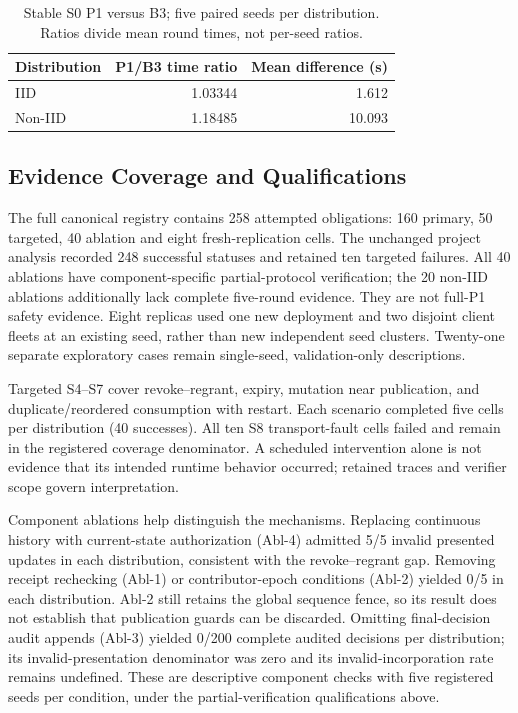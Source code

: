 \documentclass[conference,letterpaper]{IEEEtran}
\begin{document}
\begin{table}[t]
\caption{Stable S0 P1 versus B3; five paired seeds per distribution. Ratios divide mean round times, not per-seed ratios.}
\label{tab:runtime}
\centering
\begin{tabular}{lrr}
\toprule
Distribution & P1/B3 time ratio & Mean difference (s)\\
\midrule
IID & 1.03344 & 1.612\\
Non-IID & 1.18485 & 10.093\\
\bottomrule
\end{tabular}
\end{table}

\subsection{Evidence Coverage and Qualifications}
The full canonical registry contains 258 attempted obligations: 160 primary, 50 targeted, 40 ablation and eight fresh-replication cells. The unchanged project analysis recorded 248 successful statuses and retained ten targeted failures. All 40 ablations have component-specific partial-protocol verification; the 20 non-IID ablations additionally lack complete five-round evidence. They are not full-P1 safety evidence. Eight replicas used one new deployment and two disjoint client fleets at an existing seed, rather than new independent seed clusters. Twenty-one separate exploratory cases remain single-seed, validation-only descriptions.

\balance
Targeted S4--S7 cover revoke--regrant, expiry, mutation near publication, and duplicate/reordered consumption with restart. Each scenario completed five cells per distribution (40 successes). All ten S8 transport-fault cells failed and remain in the registered coverage denominator. A scheduled intervention alone is not evidence that its intended runtime behavior occurred; retained traces and verifier scope govern interpretation.

Component ablations help distinguish the mechanisms. Replacing continuous history with current-state authorization (Abl-4) admitted 5/5 invalid presented updates in each distribution, consistent with the revoke--regrant gap. Removing receipt rechecking (Abl-1) or contributor-epoch conditions (Abl-2) yielded 0/5 in each distribution. Abl-2 still retains the global sequence fence, so its result does not establish that publication guards can be discarded. Omitting final-decision audit appends (Abl-3) yielded 0/200 complete audited decisions per distribution; its invalid-presentation denominator was zero and its invalid-incorporation rate remains undefined. These are descriptive component checks with five registered seeds per condition, under the partial-verification qualifications above.
\end{document}
